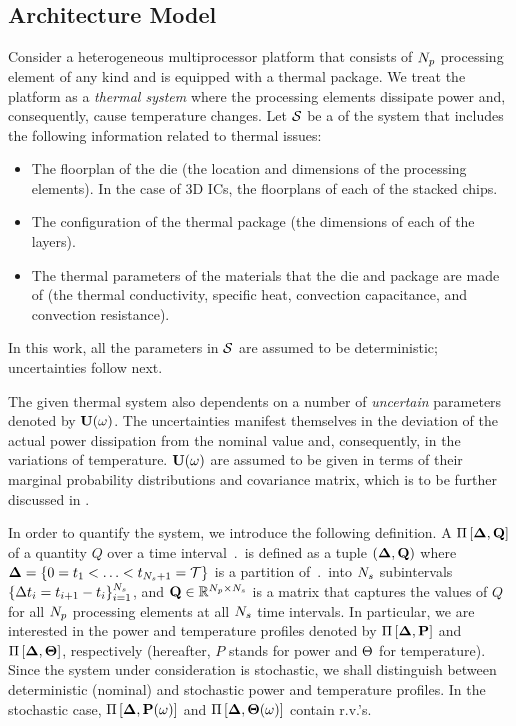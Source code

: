 \subsection{Architecture Model}  
Consider a heterogeneous multiprocessor platform that consists of ${N_p}$ processing element of any kind and is equipped with a thermal package. We treat the platform as a \emph{thermal system} where the processing elements dissipate power and, consequently, cause temperature changes. Let $\mathcal{S}$ be a  of the system that includes the following information related to thermal issues:
\begin{itemize}
  \item The floorplan of the die (the location and dimensions of the processing elements). In the case of 3D ICs, the floorplans of each of the stacked chips.
  \item The configuration of the thermal package (the dimensions of each of the layers).
  \item The thermal parameters of the materials that the die and package are made of (the thermal conductivity, specific heat, convection capacitance, and convection resistance).
\end{itemize}
In this work, all the parameters in $\mathcal{S}$ are assumed to be deterministic; uncertainties follow next.

The given thermal system also dependents on a number of \emph{uncertain} parameters denoted by $\mathbf{U}(\omega)$. The uncertainties manifest themselves in the deviation of the actual power dissipation from the nominal value and, consequently, in the variations of temperature. $\mathbf{U}(\omega)$ are assumed to be given in terms of their marginal probability distributions and covariance matrix, which is to be further discussed in .

In order to quantify the system, we introduce the following definition. A  $\prof{\m{Q}}$ of a quantity $Q$ over a time interval $\period$ is defined as a tuple $(\part, \m{Q})$ where $\boldsymbol{\Delta} = \{ 0 = t_1 < \dotsc < t_{{N_s} + 1} = \mathcal{T} \}$ is a partition of $\period$ into ${N_s}$ subintervals $\{ \Delta t_i = t_{i+1} - t_i \}_{i = 1}^{{N_s}}$, and $\m{Q} \in \real^{\cores \times \steps}$ is a matrix that captures the values of $Q$ for all ${N_p}$ processing elements at all ${N_s}$ time intervals. In particular, we are interested in the power and temperature profiles denoted by $\prof{\mP}$ and $\Pi\left[\boldsymbol{\Delta}, {\boldsymbol\Theta}\right]$, respectively (hereafter, $P$ stands for power and $\Theta$ for temperature). Since the system under consideration is stochastic, we shall distinguish between deterministic (nominal) and stochastic power and temperature profiles. In the stochastic case, $\prof{\mP(\o)}$ and $\Pi\left[\boldsymbol{\Delta}, {\boldsymbol\Theta}(\omega)\right]$ contain r.v.'s.
